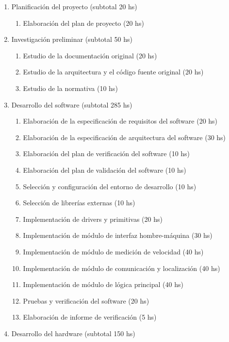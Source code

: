 \documentclass[11pt]{charter}
\begin{document}
\begin{enumerate}
\item Planificación del proyecto \hfill (subtotal 20 hs)
  \begin{enumerate}
  \item Elaboración del plan de proyecto \hfill (20 hs)
  \end{enumerate}
\item Investigación preliminar \hfill (subtotal 50 hs)
  \begin{enumerate}
  \item Estudio de la documentación original \hfill (20 hs)
  \item Estudio de la arquitectura y el código fuente original \hfill (20 hs)
  \item Estudio de la normativa \hfill (10 hs)
  \end{enumerate}
\item Desarrollo del software \hfill (subtotal 285 hs)
  \begin{enumerate}
  \item Elaboración de la especificación de requisitos del software \hfill (20 hs)
  \item Elaboración de la especificación de arquitectura del software \hfill (30 hs)
  \item Elaboración del plan de verificación del software \hfill (10 hs)
  \item Elaboración del plan de validación del software \hfill (10 hs)
  \item Selección y configuración del entorno de desarrollo \hfill (10 hs)
  \item Selección de librerías externas \hfill (10 hs)
  \item Implementación de drivers y primitivas \hfill (20 hs)
  \item Implementación de módulo de interfaz hombre-máquina \hfill (30 hs)
  \item Implementación de módulo de medición de velocidad \hfill (40 hs)
  \item Implementación de módulo de comunicación y localización \hfill (40 hs)
  \item Implementación de módulo de lógica principal \hfill (40 hs)
  \item Pruebas y verificación del software \hfill (20 hs)
  \item Elaboración de informe de verificación \hfill (5 hs)
  \end{enumerate}
\item Desarrollo del hardware \hfill (subtotal 150 hs)

\end{enumerate}
\end{document}
